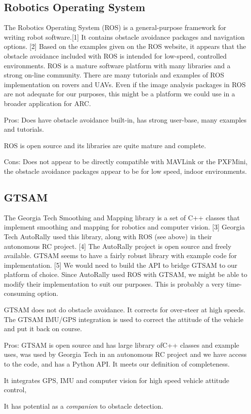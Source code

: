 \documentclass[compsoc,draftclsnofoot,onecolumn,10pt]{IEEEtran}
\begin{document}
\subsection{Robotics Operating System}
The Robotics Operating System (ROS) is a general-purpose framework for writing
robot software.[1] It contains obstacle avoidance packages and navigation
options. [2] Based on the examples given on the ROS website, it appears that the
obstacle avoidance included with ROS is intended for low-speed, controlled
environments. ROS is a mature software platform with many libraries and a strong
on-line community.  There are many tutorials and examples of ROS implementation
on rovers and UAVs.  Even if the image analysis packages in ROS are not adequate
for our purposes, this might be a platform we could use in a broader application
for ARC.\par

Pros: Does have obstacle avoidance built-in, has strong user-base, many examples
and tutorials.\par

ROS is open source and its libraries are quite mature and complete.

Cons: Does not appear to be directly compatible with MAVLink or the PXFMini, the
obstacle avoidance packages appear to be for low speed, indoor environments.

\subsection{GTSAM}
The Georgia Tech Smoothing and Mapping library is a set of C++ classes that
implement smoothing and mapping for robotics and computer vision. [3] Georgia
Tech AutoRally used this library, along with ROS (see above) in their autonomous RC
project. [4] The AutoRally project is open source and freely available. GTSAM
seems to have a fairly robust library with example code for implementation. [5]
We would need to build the API to bridge GTSAM to our platform of choice. Since
AutoRally used ROS with GTSAM, we might be able to modify their implementation
to suit our purposes. This is probably a very time-consuming option.

GTSAM does not do obstacle avoidance. It corrects for over-steer at high speeds.
The GTSAM IMU/GPS integration is used to correct the attitude of the vehicle and
put it back on course.


Pros: GTSAM is open source and has large library ofC++ classes and example uses,
was used by Georgia Tech in an autonomous RC project and we have access to the code,
and has a Python API. It meets our definition of completeness.\par
It integrates GPS, IMU and computer vision for high speed vehicle attitude control, \par
It has potential as a \textit{companion} to obstacle detection.
\end{document}
